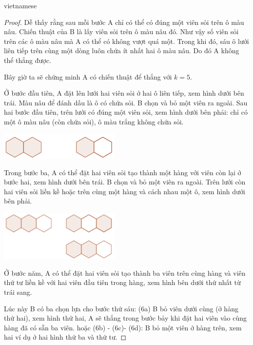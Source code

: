 \documentclass{article}
\begin{document}
\begin{otherlanguage*}{vietnamese}
\begin{proof}
    Dễ thấy rằng sau mỗi bước A chỉ có thể có đúng một viên sỏi trên ô màu nâu.
    Chiến thuật của B là lấy viên sỏi trên ô màu nâu đó. Như vậy số viên sỏi trên các ô màu nâu mà A có thể có không vượt quá một.
    Trong khi đó, sáu ô lưới liên tiếp trên cùng một dòng luôn chứa ít nhất hai ô màu nâu.
    Do đó A không thể thắng được.

    Bây giờ ta sẽ chứng minh A có chiến thuật để thắng với $k=5.$
    
    Ở bước đầu tiên, A đặt lên lưới hai viên sỏi ở hai ô liên tiếp, xem hình dưới bên trái. Màu nâu để đánh dấu là ô có chứa sỏi.
    B chọn và bỏ một viên ra ngoài. Sau hai bước đầu tiên, trên lưới có đúng một viên sỏi,
    xem hình dưới bên phải: chỉ có một ô màu nâu (còn chứa sỏi), ô màu trắng không chứa sỏi.

    \begin{center}
        \includegraphics[width=6cm]{./svg/pdf/pi-2024-1-p3-1-2.pdf}
    \end{center}

\newpage

    Trong bước ba, A có thể đặt hai viên sỏi tạo thành một hàng với viên còn lại ở bước hai, xem hình dưới bên trái.
    B chọn và bỏ một viên ra ngoài. Trên lưới còn hai viên sỏi liền kề hoặc trên cùng một hàng và cách nhau một ô, xem hình dưới bên phải. 

    \begin{center}
        \includegraphics[width=6cm]{./svg/pdf/pi-2024-1-p3-3-4.pdf}
    \end{center}

    Ở bước năm, A có thể đặt hai viên sỏi tạo thành ba viên trên cùng hàng và viên thứ tư liền kề với hai viên đầu tiên trong hàng, xem hình bên dưới thứ nhất từ trái sang.
    
    Lúc này B có ba chọn lựa cho bước thứ sáu: (6a) B bỏ viên dưới cùng (ở hàng thứ hai), xem hình thứ hai, A sẽ thắng trong bước bảy khi đặt hai viên vào cùng hàng đã có sẵn ba viên.
    hoặc (6b) - (6c)- (6d): B bỏ một viên ở hàng trên, xem hai ví dụ ở hai hình thứ ba và thứ tư.


\end{proof}
\end{otherlanguage*}
\end{document}
